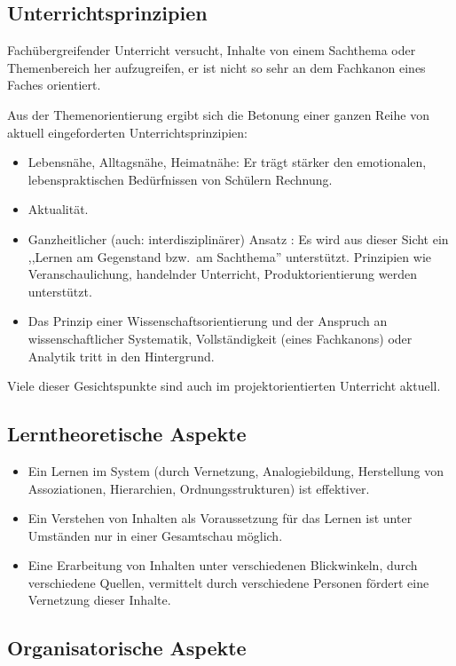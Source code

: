 \subsection{Unterrichtsprinzipien}
Fach\"{u}bergreifender Unterricht versucht,
Inhalte von einem Sachthema oder Themenbereich her aufzugreifen,
er ist nicht so sehr an dem Fachkanon eines Faches orientiert.

Aus der Themenorientierung ergibt sich die Betonung einer
ganzen Reihe von aktuell eingeforderten Unterrichtsprinzipien:
\begin{itemize}
\setlength{\itemsep}{0mm}
\item
Lebensn\"{a}he, Alltagsn\"{a}he, Heimatn\"{a}he:
Er tr\"{a}gt st\"{a}rker den emotionalen, lebenspraktischen Bed\"{u}rfnissen
von Sch\"{u}lern Rechnung.
\item
Aktualit\"{a}t.
\item
Ganzheitlicher (auch: interdisziplin\"{a}rer) Ansatz :
Es wird aus dieser Sicht ein
,,Lernen am Gegenstand bzw.\ am Sachthema'' unterst\"{u}tzt.
Prinzipien wie Veranschaulichung, handelnder Unterricht,
Produktorientierung werden unterst\"{u}tzt.
\item
Das Prinzip einer Wissenschaftsorientierung und der Anspruch an
wissenschaftlicher Systematik, Vollst\"{a}ndigkeit (eines Fachkanons)
oder Analytik tritt in den Hintergrund.
\end{itemize}

Viele dieser Gesichtspunkte sind auch im projektorientierten
Unterricht aktuell.

\subsection{Lerntheoretische Aspekte}
\begin{itemize}
\setlength{\itemsep}{0mm}
\item
Ein Lernen im System (durch Vernetzung,
Analogiebildung, Herstellung von Assoziationen, Hierarchien,
Ordnungsstrukturen) ist effektiver.

\item
Ein Verstehen von Inhalten als Voraussetzung f\"{u}r das Lernen
ist unter Umst\"{a}nden nur in einer Gesamtschau m\"{o}glich.
\item
Eine Erarbeitung von Inhalten unter verschiedenen Blickwinkeln,
durch verschiedene Quellen, vermittelt durch verschiedene
Personen f\"{o}rdert eine Vernetzung dieser Inhalte.
\end{itemize}

\subsection{Organisatorische Aspekte}

